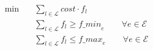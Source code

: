 \begin{align}
  \min\quad & \sum_{l \in \mathcal{L}} \mathit{cost} \cdot f_{l} \tag{objective} \\
  & \sum_{l \in \mathcal{L}} f_{l} \ge \mathit{f\_min}_{e} \qquad \forall e \in \mathcal{E} \tag{edge\_lower\_frequency\_bound} \\
  & \sum_{l \in \mathcal{L}} f_{l} \le \mathit{f\_max}_{e} \qquad \forall e \in \mathcal{E} \tag{edge\_upper\_frequency\_bound} \\
\end{align}
